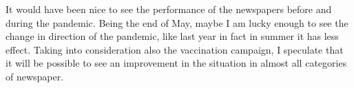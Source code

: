 It would have been nice to see the performance of the newspapers before and during the pandemic. 
Being the end of May, maybe I am lucky enough to see the change in direction of the pandemic, like last year in fact in summer it has less effect. Taking into consideration also the vaccination campaign, I speculate that it will be possible to see an improvement in the situation in almost all categories of newspaper. 